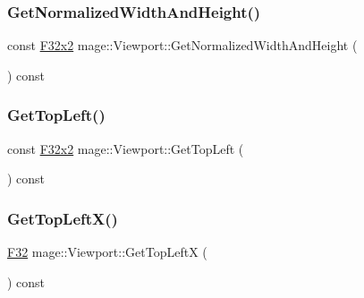 \hypertarget{classmage_1_1_viewport_a9af5dc2aed1340dc59d012d6dd3f9429}{}\label{classmage_1_1_viewport_a9af5dc2aed1340dc59d012d6dd3f9429} 
\subsubsection{\texorpdfstring{Get\+Normalized\+Width\+And\+Height()}{GetNormalizedWidthAndHeight()}}
{\footnotesize\ttfamily const \hyperlink{namespacemage_aa87237ad091f5cd7da612b8523fc108f}{F32x2} mage\+::\+Viewport\+::\+Get\+Normalized\+Width\+And\+Height (\begin{DoxyParamCaption}{ }\end{DoxyParamCaption}) const\hspace{0.3cm}{\ttfamily [noexcept]}}

\hypertarget{classmage_1_1_viewport_a6b4be7d37cc6d52d0c238f266b80a23f}{}\label{classmage_1_1_viewport_a6b4be7d37cc6d52d0c238f266b80a23f} 
\subsubsection{\texorpdfstring{Get\+Top\+Left()}{GetTopLeft()}}
{\footnotesize\ttfamily const \hyperlink{namespacemage_aa87237ad091f5cd7da612b8523fc108f}{F32x2} mage\+::\+Viewport\+::\+Get\+Top\+Left (\begin{DoxyParamCaption}{ }\end{DoxyParamCaption}) const\hspace{0.3cm}{\ttfamily [noexcept]}}

\hypertarget{classmage_1_1_viewport_a8ca949f032906839c8cf4ab6018bb2ba}{}\label{classmage_1_1_viewport_a8ca949f032906839c8cf4ab6018bb2ba} 
\subsubsection{\texorpdfstring{Get\+Top\+Left\+X()}{GetTopLeftX()}}
{\footnotesize\ttfamily \hyperlink{namespacemage_aa97e833b45f06d60a0a9c4fc22ae02c0}{F32} mage\+::\+Viewport\+::\+Get\+Top\+LeftX (\begin{DoxyParamCaption}{ }\end{DoxyParamCaption}) const\hspace{0.3cm}{\ttfamily [noexcept]}}


